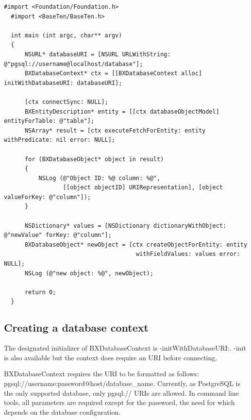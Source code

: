  
  \begin{lstlisting}[caption=A simple command line tool that uses BaseTen]
  #import <Foundation/Foundation.h>
  #import <BaseTen/BaseTen.h>
 
  int main (int argc, char** argv)
  {
      NSURL* databaseURI = [NSURL URLWithString: @"pgsql://username@localhost/database"];
      BXDatabaseContext* ctx = [[BXDatabaseContext alloc] initWithDatabaseURI: databaseURI];
  
      [ctx connectSync: NULL];
      BXEntityDescription* entity = [[ctx databaseObjectModel] entityForTable: @"table"];
      NSArray* result = [ctx executeFetchForEntity: entity withPredicate: nil error: NULL];
 
      for (BXDatabaseObject* object in result)
      {
          NSLog (@"Object ID: %@ column: %@", 
                 [[object objectID] URIRepresentation], [object valueForKey: @"column"]);
      }
 
      NSDictionary* values = [NSDictionary dictionaryWithObject: @"newValue" forKey: @"column"];
      BXDatabaseObject* newObject = [ctx createObjectForEntity: entity 
                                      withFieldValues: values error: NULL];
      NSLog (@"new object: %@", newObject);
 
      return 0;
  }
  \end{lstlisting} 
   \hypertarget{getting_started_creating_a_database_context}{}\subsection{Creating a database context}\label{getting_started_creating_a_database_context}
The designated initializer of B\+X\+Database\+Context is -\/init\+With\+Database\+U\+R\+I\+:. -\/init is also available but the context does require an U\+R\+I before connecting.

B\+X\+Database\+Context requires the U\+R\+I to be formatted as follows\+:~\newline
 {\ttfamily pgsql\+://username\+:password@host/database\+\_\+name}. Currently, as Postgre\+S\+Q\+L is the only supported database, only {\ttfamily pgsql\+://} U\+R\+Is are allowed. In command line tools, all parameters are required except for the password, the need for which depends on the database configuration.

